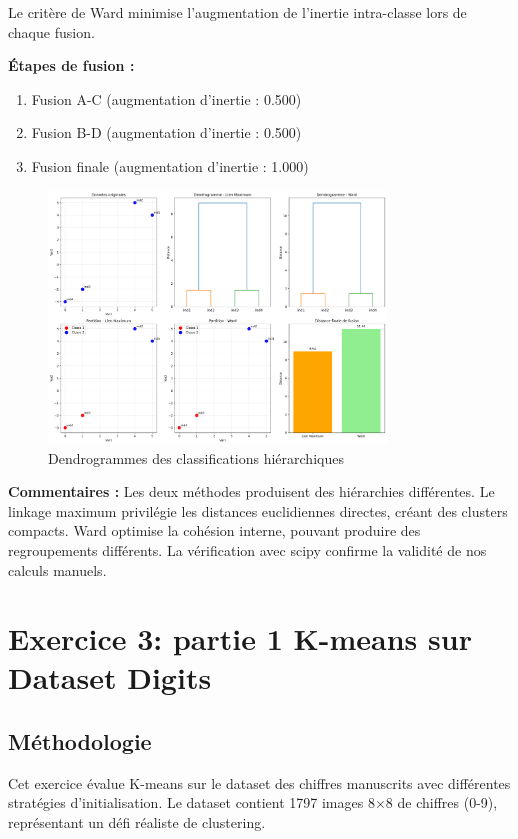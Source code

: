 \documentclass[12pt,a4paper]{article}
\begin{document}
Le critère de Ward minimise l'augmentation de l'inertie intra-classe lors de chaque fusion.

\textbf{Étapes de fusion :}
\begin{enumerate}
    \item Fusion A-C (augmentation d'inertie : 0.500)
    \item Fusion B-D (augmentation d'inertie : 0.500)
    \item Fusion finale (augmentation d'inertie : 1.000)
\end{enumerate}

\begin{figure}[H]
    \centering
    \includegraphics[width=0.8\textwidth]{exercice2_hierarchique.png}
    \caption{Dendrogrammes des classifications hiérarchiques}
    \label{fig:hierarchique}
\end{figure}

\textbf{Commentaires :} Les deux méthodes produisent des hiérarchies différentes. Le linkage maximum privilégie les distances euclidiennes directes, créant des clusters compacts. Ward optimise la cohésion interne, pouvant produire des regroupements différents. La vérification avec scipy confirme la validité de nos calculs manuels.

\section{Exercice 3:  partie 1 K-means sur Dataset Digits}

\subsection{Méthodologie}

Cet exercice évalue K-means sur le dataset des chiffres manuscrits avec différentes stratégies d'initialisation. Le dataset contient 1797 images 8×8 de chiffres (0-9), représentant un défi réaliste de clustering.
\end{document}
